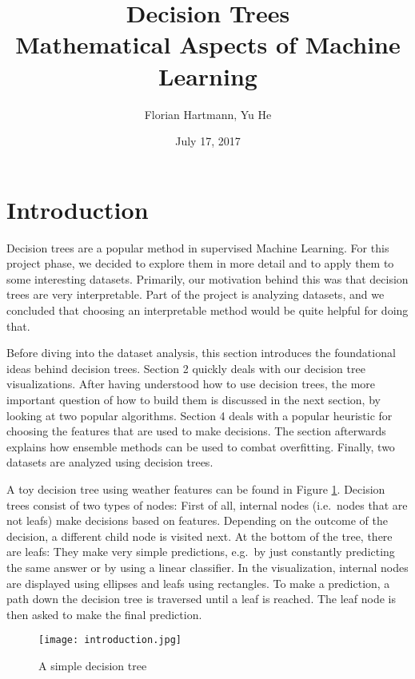 \documentclass[a4paper]{article}
\title{Decision Trees\\\large{Mathematical Aspects of Machine Learning}}
\author{Florian Hartmann, Yu He}
\date{July 17, 2017}
\begin{document}
\maketitle

\section{Introduction}

Decision trees are a popular method in supervised Machine Learning. For this project phase, we decided to explore them in more detail and to apply them to some interesting datasets. Primarily, our motivation behind this was that decision trees are very interpretable. Part of the project is analyzing datasets, and we concluded that choosing an interpretable method would be quite helpful for doing that.

Before diving into the dataset analysis, this section introduces the foundational ideas behind decision trees. Section 2 quickly deals with our decision tree visualizations. After having understood how to use decision trees, the more important question of how to build them is discussed in the next section, by looking at two popular algorithms. Section 4 deals with a popular heuristic for choosing the features that are used to make decisions.
The section afterwards explains how ensemble methods can be used to combat overfitting. Finally, two datasets are analyzed using decision trees.

A toy decision tree using weather features can be found in Figure \ref{fig:simple}. Decision trees consist of two types of nodes: First of all, internal nodes (i.e.\ nodes that are not leafs) make decisions based on features. Depending on the outcome of the decision, a different child node is visited next. At the bottom of the tree, there are leafs: They make very simple predictions, e.g.\ by just constantly predicting the same answer or by using a linear classifier. In the visualization, internal nodes are displayed using ellipses and leafs using rectangles. To make a prediction, a path down the decision tree is traversed until a leaf is reached. The leaf node is then asked to make the final prediction.

\begin{figure}
	\centering
	\texttt{[image: introduction.jpg]}
    \caption{A simple decision tree}
    \label{fig:simple}
\end{figure}
\end{document}
